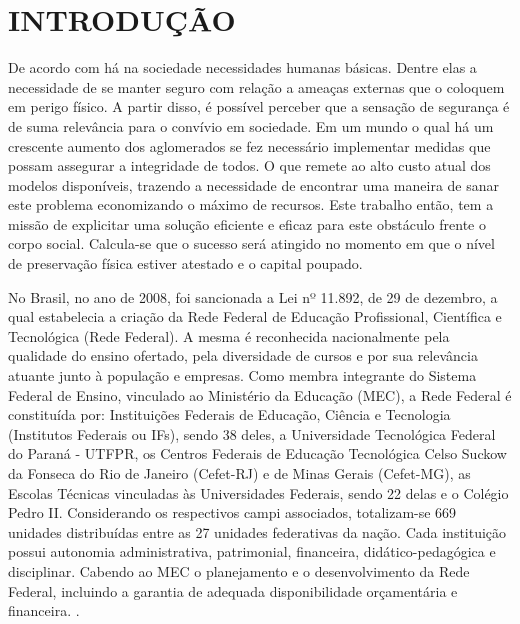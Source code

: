 \chapter{INTRODUÇÃO}
\label{cap:introducao}

De acordo com  há na sociedade necessidades humanas básicas.
Dentre elas a necessidade de se manter seguro com relação a ameaças externas
que o coloquem em perigo físico. A partir disso, é possível perceber que a sensação
de segurança é de suma relevância para o convívio em sociedade. Em um mundo o qual há um crescente
aumento dos aglomerados se fez necessário implementar medidas que possam assegurar a
integridade de todos. O que remete ao alto custo atual dos modelos disponíveis, trazendo a necessidade
de encontrar uma maneira de sanar este problema economizando o máximo de recursos. Este trabalho então, tem a missão de explicitar uma solução eficiente e eficaz para este obstáculo frente o corpo social. Calcula-se que o sucesso será atingido no momento em que
o nível de preservação física estiver atestado e o capital poupado.



No Brasil, no ano de 2008, foi sancionada a Lei nº 11.892, de 29 de dezembro, a qual estabelecia a criação da Rede Federal de Educação Profissional, Científica e Tecnológica (Rede Federal). A mesma é reconhecida nacionalmente pela qualidade do ensino ofertado, pela diversidade de cursos e por sua relevância atuante junto à população e empresas. Como membra integrante do Sistema Federal de Ensino, vinculado ao Ministério da Educação (MEC), a Rede Federal é constituída por: Instituições Federais de Educação, Ciência e Tecnologia (Institutos Federais ou IFs), sendo 38 deles, a Universidade Tecnológica Federal do Paraná - UTFPR, os Centros Federais de Educação Tecnológica Celso Suckow da Fonseca do Rio de Janeiro (Cefet-RJ) e de Minas Gerais (Cefet-MG), as Escolas Técnicas vinculadas às Universidades Federais, sendo 22 delas e o Colégio Pedro II. Considerando os respectivos campi associados, totalizam-se 669 unidades distribuídas entre as 27 unidades federativas da nação. Cada instituição possui autonomia administrativa,  patrimonial, financeira, didático-pedagógica e disciplinar. Cabendo ao MEC o planejamento e o desenvolvimento da Rede Federal, incluindo a garantia de adequada disponibilidade orçamentária e financeira. \cite{redefederal}.



